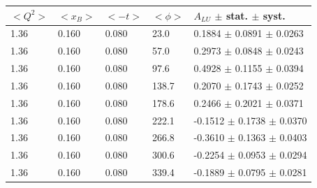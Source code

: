 \begin{table}[!h]
   \begin{center}
      \begin{tabular}{||l|l|l|l|l||}
         \hline
 $<Q^{2}>$ & $<x_{B}>$ & $<-t>$ & $<\phi>$ & $A_{LU}$ $\pm$ stat. $\pm$ syst.\\
         \hline
  1.36 & 0.160 & 0.080 & 23.0  &  0.1884 $\pm$ 0.0891 $\pm$ 0.0263 \\
  1.36 & 0.160 & 0.080 & 57.0  &  0.2973 $\pm$ 0.0848 $\pm$ 0.0243 \\
  1.36 & 0.160 & 0.080 & 97.6  &  0.4928 $\pm$ 0.1155 $\pm$ 0.0394 \\
  1.36 & 0.160 & 0.080 & 138.7 &  0.2070 $\pm$ 0.1743 $\pm$ 0.0252 \\
  1.36 & 0.160 & 0.080 & 178.6 &  0.2466 $\pm$ 0.2021 $\pm$ 0.0371 \\
  1.36 & 0.160 & 0.080 & 222.1 & -0.1512 $\pm$ 0.1738 $\pm$ 0.0370 \\
  1.36 & 0.160 & 0.080 & 266.8 & -0.3610 $\pm$ 0.1363 $\pm$ 0.0403 \\
  1.36 & 0.160 & 0.080 & 300.6 & -0.2254 $\pm$ 0.0953 $\pm$ 0.0294 \\
  1.36 & 0.160 & 0.080 & 339.4 & -0.1889 $\pm$ 0.0795 $\pm$ 0.0281 \\
         
         \hline                                                                                                         


\end{tabular}
\end{center}
\end{table}
